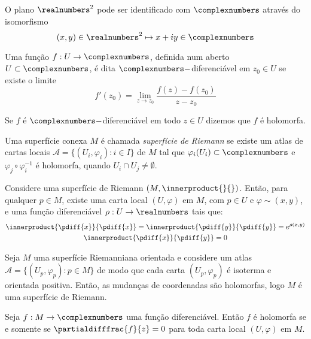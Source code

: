 \begin{obse}
	O plano $\realnumbers^2$ pode ser identificado com $\complexnumbers$ através do isomorfismo
	\begin{equation*}
		(x,y) \in \realnumbers^2 \mapsto x + iy \in \complexnumbers
	\end{equation*}
	
	Uma função $f: U \rightarrow \complexnumbers$, definida num aberto $U \subset \complexnumbers$, é dita $\complexnumbers-$diferenciável em $z_0 \in U$ se existe o limite
	\begin{equation*}
		f'(z_0) = \lim_{z \rightarrow z_0} \frac{f(z) - f(z_0)}{z - z_0}
	\end{equation*}
	
	Se $f$ é $\complexnumbers-$diferenciável em todo $z \in U$ dizemos que $f$ é holomorfa.
\end{obse}

\begin{defi}
	Uma superfície conexa $M$ é chamada \emph{superfície de Riemann} se existe um atlas de cartas locais $\mathcal{A} = \{ (U_i,\varphi_i): i \in I \}$ de $M$ tal que $\varphi_i(U_i) \subset \complexnumbers$ e $\varphi_j \circ \varphi_i^{-1}$ é holomorfa, quando $U_i \cap U_j \neq \emptyset$.
\end{defi}

\begin{teo}
	Considere uma superfície de Riemann $(M, \innerproduct{}{})$. Então, para qualquer $p \in M$, existe uma carta local $(U,\varphi)$ em $M$, com $p \in U$ e $\varphi \sim (x,y)$, e uma função diferenciável $\rho: U \rightarrow \realnumbers$ tais que:
	\begin{gather*}
		\innerproduct{\pdiff{x}}{\pdiff{x}} = \innerproduct{\pdiff{y}}{\pdiff{y}} = e^{\rho(x,y)}\\
		\innerproduct{\pdiff{x}}{\pdiff{y}} = 0
	\end{gather*}
\end{teo}

\begin{teo}
	Seja $M$ uma superfície Riemanniana orientada e considere um atlas $\mathcal{A} = \{ (U_p,\varphi_p): p \in M \}$ de modo que cada carta $(U_p,\varphi_p)$ é isoterma e orientada positiva. Então, as mudanças de coordenadas são holomorfas, logo $M$ é uma superfície de Riemann.
\end{teo}

\begin{prop}
	Seja $f: M \rightarrow \complexnumbers$ uma função diferenciável. Então $f$ é holomorfa se e somente se $\partialdifffrac{f}{z} = 0$ para toda carta local $(U,\varphi)$ em $M$.
\end{prop}